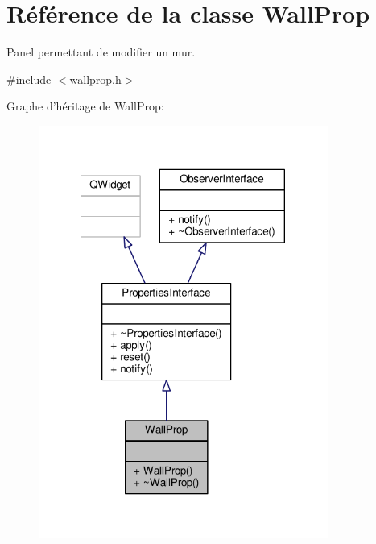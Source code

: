 \hypertarget{classWallProp}{\section{Référence de la classe Wall\+Prop}
\label{classWallProp}
}


Panel permettant de modifier un mur.  




{\ttfamily \#include $<$wallprop.\+h$>$}



Graphe d'héritage de Wall\+Prop\+:
\nopagebreak
\begin{figure}[H]
\begin{center}
\leavevmode
\includegraphics[width=269pt]{dd/d41/classWallProp__inherit__graph}
\end{center}
\end{figure}


